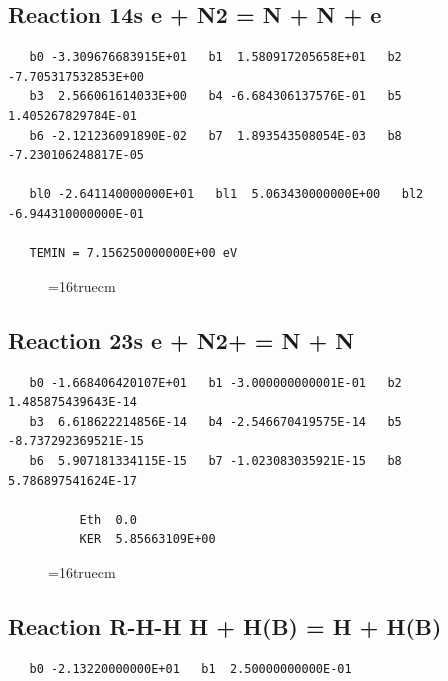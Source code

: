 \documentclass[12pt]{article}
\begin{document}
\subsection{
Reaction 14s e + N2 = N + N + e }
\begin{small}\begin{verbatim}
   b0 -3.309676683915E+01   b1  1.580917205658E+01   b2 -7.705317532853E+00
   b3  2.566061614033E+00   b4 -6.684306137576E-01   b5  1.405267829784E-01
   b6 -2.121236091890E-02   b7  1.893543508054E-03   b8 -7.230106248817E-05

   bl0 -2.641140000000E+01   bl1  5.063430000000E+00   bl2 -6.944310000000E-01

   TEMIN = 7.156250000000E+00 eV
\end{verbatim}\end{small}
\begin{figure}[h!] \label{n2rates}
\epsfxsize=16truecm
\end{figure}
\newpage

\subsection{
Reaction 23s e + N2+ = N + N }
\begin{small}\begin{verbatim}
   b0 -1.668406420107E+01   b1 -3.000000000001E-01   b2  1.485875439643E-14
   b3  6.618622214856E-14   b4 -2.546670419575E-14   b5 -8.737292369521E-15
   b6  5.907181334115E-15   b7 -1.023083035921E-15   b8  5.786897541624E-17

          Eth  0.0
          KER  5.85663109E+00

\end{verbatim}\end{small}
\begin{figure}[h!] \label{n2rates}
\epsfxsize=16truecm
\end{figure}
\newpage

\subsection{
Reaction R-H-H H + H(B) = H + H(B) }
\begin{small}\begin{verbatim}
   b0 -2.13220000000E+01   b1  2.50000000000E-01
\end{verbatim}\end{small}
\newpage
\end{document}
